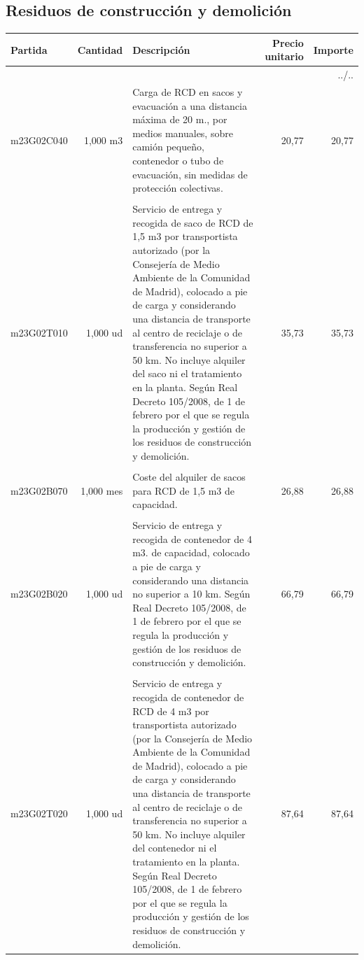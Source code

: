 \documentclass{book}%
\begin{document}
\subsection{Residuos de construcción y demolición}%
\small%
\begin{longtable}{lrlrr}%
Partida&Cantidad&Descripción&\multicolumn{1}{p{1.5cm}}{Precio unitario}&Importe\\%
\hline%
\endhead%
\multicolumn{5}{r}{../..}\\%
\endfoot%
\hline%
\endlastfoot%
m23G02C040&     1,000 m3&\multicolumn{1}{p{5cm}}{Carga de RCD en sacos y evacuación a una distancia máxima de 20 m., por medios manuales, sobre camión pequeño, contenedor o tubo de evacuación, sin medidas de protección colectivas.}&     20,77&20,77\\%
&&&&\\%
m23G02T010&     1,000 ud&\multicolumn{1}{p{5cm}}{Servicio de entrega y recogida de saco de RCD de 1,5 m3 por transportista autorizado (por la Consejería de Medio Ambiente de la Comunidad de Madrid), colocado a pie de carga y considerando una distancia de transporte al centro de reciclaje o de transferencia no superior a 50 km. No incluye alquiler del saco ni el tratamiento en la planta. Según Real Decreto 105/2008, de 1 de febrero por el que se regula la producción y gestión de los residuos de construcción y demolición.}&     35,73&35,73\\%
&&&&\\%
m23G02B070&     1,000 mes&\multicolumn{1}{p{5cm}}{Coste del alquiler de sacos para RCD de 1,5 m3 de capacidad.}&     26,88&26,88\\%
&&&&\\%
m23G02B020&     1,000 ud&\multicolumn{1}{p{5cm}}{Servicio de entrega y recogida de contenedor de 4 m3. de capacidad, colocado a pie de carga y considerando una distancia no superior a 10 km. Según Real Decreto 105/2008, de 1 de febrero por el que se regula la producción y gestión de los residuos de construcción y demolición.}&     66,79&66,79\\%
&&&&\\%
m23G02T020&     1,000 ud&\multicolumn{1}{p{5cm}}{Servicio de entrega y recogida de contenedor de RCD de 4 m3 por transportista autorizado (por la Consejería de Medio Ambiente de la Comunidad de Madrid), colocado a pie de carga y considerando una distancia de transporte al centro de reciclaje o de transferencia no superior a 50 km. No incluye alquiler del contenedor ni el tratamiento en la planta. Según Real Decreto 105/2008, de 1 de febrero por el que se regula la producción y gestión de los residuos de construcción y demolición.}&     87,64&87,64\\%

\end{longtable}
\end{document}
